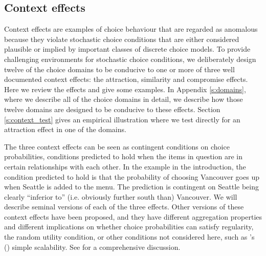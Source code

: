 \documentclass[11pt,letter]{article}
\newcommand{\menu}{menu}
\begin{document}
\subsection{Context effects}\label{s:context_effects}

Context effects are examples of choice behaviour that are regarded as anomalous because they violate stochastic choice conditions that are either considered plausible or implied by important classes of discrete choice models.
To provide challenging environments for stochastic choice conditions, we deliberately design twelve of the choice domains to be conducive to one or more of three well documented context effects: the attraction, similarity and compromise effects.
Here we review the effects and give some examples.
In Appendix \ref{s:domains}, where we describe all of the choice domains in detail, we describe how those twelve domains are designed to be conducive to these effects.
Section \ref{s:context_test} gives an empirical illustration where we test directly for an attraction effect in one of the domains.

The three context effects can be seen as contingent conditions on choice probabilities, conditions predicted to hold when the items in question are in certain relationships with each other.
In the example in the introduction, the condition predicted to hold is that the probability of choosing Vancouver goes up when Seattle is added to the \menu{}.
The prediction is contingent on Seattle being clearly ``inferior to'' (i.e. obviously further south than) Vancouver.
We will describe seminal versions of each of the three effects.
Other versions of these context effects have been proposed, and they have different aggregation properties and different implications on whether choice probabilities can satisfy regularity, the random utility condition, or other conditions not considered here, such as \citeauthor{Kran67}'s (\citeyear{Kran67}) simple scalability.
See \citet{StobMarlMcCaTurn23} for a comprehensive discussion.
\end{document}

